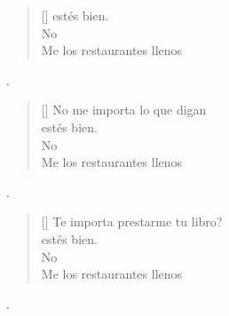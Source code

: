 \documentclass[grid,avery5371]{flashcards}
\begin{document}
\begin{flashcard}{%
\begin{verse}[\versewidth]
   estés bien.\\
No  \\
Me  los restaurantes llenos\\
\end{verse}
}
.
\end{flashcard}


\begin{flashcard}{%
\begin{verse}[\versewidth]
No me importa lo que digan\\
   estés bien.\\
No  \\
Me  los restaurantes llenos\\
\end{verse}
}
.
\end{flashcard}

\begin{flashcard}{%
\begin{verse}[\versewidth]
Te importa prestarme tu libro?\\
   estés bien.\\
No  \\
Me  los restaurantes llenos\\
\end{verse}
}
.
\end{flashcard}
\end{document}
